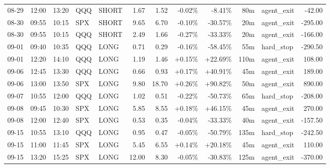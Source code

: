 \documentclass[11pt,a4paper,twoside]{article}
\begin{document}
\begin{center}
\begin{longtable}{>{\color{txtmain}}l l l l l r r r r r >{\color{txtmain}}l r}
08-29 & 12:00 & 13:20 & QQQ & SHORT & 1.67 & 1.52 & \textcolor{lossred}{-0.02\%} & \textcolor{lossred}{-8.41\%} & 80m & agent\_exit & \textcolor{lossred}{-42.00} \\
08-30 & 09:55 & 10:15 & SPX & SHORT & 9.65 & 6.70 & \textcolor{lossred}{-0.10\%} & \textcolor{lossred}{-30.57\%} & 20m & agent\_exit & \textcolor{lossred}{-295.00} \\
08-30 & 09:55 & 10:15 & QQQ & SHORT & 2.49 & 1.66 & \textcolor{lossred}{-0.27\%} & \textcolor{lossred}{-33.33\%} & 20m & agent\_exit & \textcolor{lossred}{-166.00} \\
09-01 & 09:40 & 10:35 & QQQ & LONG & 0.71 & 0.29 & \textcolor{lossred}{-0.16\%} & \textcolor{lossred}{-58.45\%} & 55m & hard\_stop & \textcolor{lossred}{-290.50} \\
09-01 & 12:20 & 14:10 & QQQ & LONG & 1.19 & 1.46 & \textcolor{wingreen}{+0.15\%} & \textcolor{wingreen}{+22.69\%} & 110m & agent\_exit & \textcolor{wingreen}{108.00} \\
09-06 & 12:45 & 13:30 & QQQ & LONG & 0.66 & 0.93 & \textcolor{wingreen}{+0.17\%} & \textcolor{wingreen}{+40.91\%} & 45m & agent\_exit & \textcolor{wingreen}{189.00} \\
09-06 & 13:00 & 13:50 & SPX & LONG & 9.80 & 18.70 & \textcolor{wingreen}{+0.26\%} & \textcolor{wingreen}{+90.82\%} & 50m & agent\_exit & \textcolor{wingreen}{890.00} \\
09-07 & 10:55 & 12:00 & QQQ & LONG & 1.02 & 0.51 & \textcolor{lossred}{-0.22\%} & \textcolor{lossred}{-50.73\%} & 65m & hard\_stop & \textcolor{lossred}{-208.00} \\
09-08 & 09:45 & 10:30 & SPX & LONG & 5.85 & 8.55 & \textcolor{wingreen}{+0.18\%} & \textcolor{wingreen}{+46.15\%} & 45m & agent\_exit & \textcolor{wingreen}{270.00} \\
09-08 & 12:00 & 12:40 & SPX & LONG & 0.53 & 0.35 & \textcolor{lossred}{-0.04\%} & \textcolor{lossred}{-33.33\%} & 40m & agent\_exit & \textcolor{lossred}{-157.50} \\
09-15 & 10:55 & 13:10 & QQQ & LONG & 0.95 & 0.47 & \textcolor{lossred}{-0.05\%} & \textcolor{lossred}{-50.79\%} & 135m & hard\_stop & \textcolor{lossred}{-242.50} \\
09-15 & 11:00 & 11:45 & SPX & LONG & 5.45 & 6.55 & \textcolor{wingreen}{+0.14\%} & \textcolor{wingreen}{+20.18\%} & 45m & agent\_exit & \textcolor{wingreen}{110.00} \\
09-15 & 13:20 & 15:25 & SPX & LONG & 12.00 & 8.30 & \textcolor{lossred}{-0.05\%} & \textcolor{lossred}{-30.83\%} & 125m & agent\_exit & \textcolor{lossred}{-370.00} \\

\end{longtable}
\end{center}
\end{document}
